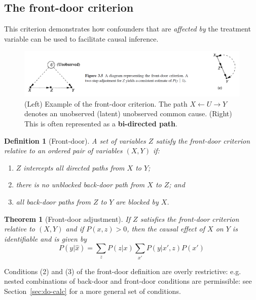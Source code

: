 \documentclass[11pt]{article}
\numberwithin{equation}{section}
\newtheorem{thm}{Theorem}[section]
\newtheorem{defn}{Definition}[section]
\begin{document}
\subsection{The front-door criterion}
This criterion demonstrates how confounders that are \textit{affected by} the treatment variable can be used to facilitate causal inference.

\begin{figure}
\begin{center}
\includegraphics[width=0.8\columnwidth]{figures/front-door.png}  
\end{center}
\caption{(Left) Example of the front-door criterion. The path $X \leftarrow U \rightarrow Y$ denotes an unobserved (latent) unobserved common cause. (Right) This is often represented as a \textbf{bi-directed path}. 
}
\label{Fig:front_door}
\end{figure}

\begin{defn}[Front-door]
A set of variables $Z$ satisfy the front-door criterion relative to an ordered pair of variables $(X, Y)$ if:
\begin{enumerate}[noitemsep]
\item $Z$ intercepts all directed paths from $X$ to $Y$; 
\item there is no unblocked back-door path from $X$ to $Z$; and
\item all back-door paths from $Z$ to $Y$ are blocked by $X$.
\end{enumerate}
\end{defn}

\begin{thm}[Front-door adjustment]
If $Z$ satisfies the front-door criterion relative to $(X, Y)$ and if $P(x, z) > 0$, then the causal effect of $X$ on $Y$ is identifiable and is given by
\begin{equation}
P(y|\hat{x}) = \sum_z P(z|x) \sum_{x'} P(y|x',z)P(x')
\end{equation}
\end{thm}

Conditions (2) and (3) of the front-door definition are overly restrictive: e.g. nested combinations of back-door and front-door conditions are permissible: see Section~\ref{sec:do-calc} for a more general set of conditions.
\end{document}
